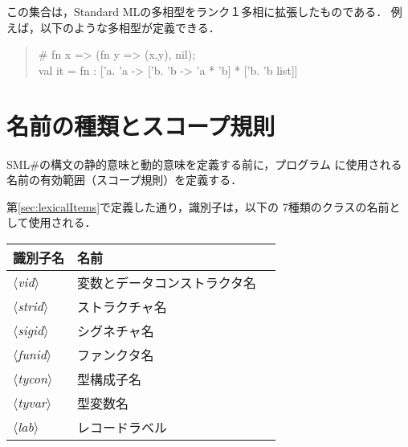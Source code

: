 \documentclass{jbook}
\newif\ifjp
\newcommand{\txt}[2]{#1}
\newcommand{\smlsharp}{SML\#}
\newcommand{\nonterm}[1]{\mbox{$\langle$}{\it #1}\mbox{$\rangle$}}
\newenvironment{program}{\begin{quote}\begin{tt}}%
                        {\end{tt}\end{quote}}
\begin{document}
	この集合は，Standard MLの多相型をランク１多相に拡張したものである．
	例えば，以下のような多相型が定義できる．
\begin{program}
\# fn x => (fn y => (x,y), nil);\\
val it = fn : ['a. 'a -> ['b. 'b -> 'a * 'b] * ['b. 'b list]]
\end{program}
\else%
\fi%

% 
\ifjp%
\else%
\fi%

\chapter{\txt{名前の種類とスコープ規則}{}}
\label{sce:scopeRule}

	\smlsharp{}の構文の静的意味と動的意味を定義する前に，プログラム
に使用される名前の有効範囲（スコープ規則）を定義する．

	第\ref{sec:lexicalItems}で定義した通り，識別子は，以下の
7種類のクラスの名前として使用される．

\begin{center}
\begin{tabular}{|l|l|l|}
\hline
識別子名 & 名前\\\hline
\nonterm{vid}   & 変数とデータコンストラクタ名\\
\nonterm{strid} & ストラクチャ名\\
\nonterm{sigid} & シグネチャ名\\
\nonterm{funid} & ファンクタ名\\
\nonterm{tycon} & 型構成子名 \\
\nonterm{tyvar} & 型変数名 \\
\nonterm{lab}   & レコードラベル\\
\hline
\end{tabular}
\end{center}
\end{document}
